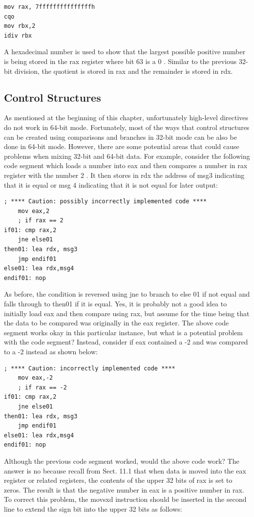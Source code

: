 \documentclass[10pt]{article}
\begin{document}
\begin{verbatim}
mov rax, 7fffffffffffffffh
cqo
mov rbx,2
idiv rbx
\end{verbatim}

A hexadecimal number is used to show that the largest possible positive number is being stored in the rax register where bit 63 is a 0 . Similar to the previous 32-bit division, the quotient is stored in rax and the remainder is stored in rdx.

\subsection*{Control Structures}
As mentioned at the beginning of this chapter, unfortunately high-level directives do not work in 64-bit mode. Fortunately, most of the ways that control structures can be created using comparisons and branches in 32-bit mode can be also be done in 64-bit mode. However, there are some potential areas that could cause problems when mixing 32-bit and 64-bit data. For example, consider the following code segment which loads a number into eax and then compares a number in rax register with the number 2 . It then stores in rdx the address of msg3 indicating that it is equal or msg 4 indicating that it is not equal for later output:

\begin{verbatim}
; **** Caution: possibly incorrectly implemented code ****
    mov eax,2
    ; if rax == 2
if01: cmp rax,2
    jne else01
then01: lea rdx, msg3
    jmp endif01
else01: lea rdx,msg4
endif01: nop
\end{verbatim}

As before, the condition is reversed using jne to branch to else 01 if not equal and falls through to then01 if it is equal. Yes, it is probably not a good idea to initially load eax and then compare using rax, but assume for the time being that the data to be compared was originally in the eax register. The above code segment works okay in this particular instance, but what is a potential problem with the code segment? Instead, consider if eax contained a -2 and was compared to a -2 instead as shown below:

\begin{verbatim}
; **** Caution: incorrectly implemented code ****
    mov eax,-2
    ; if rax == -2
if01: cmp rax,2
    jne else01
then01: lea rdx, msg3
    jmp endif01
else01: lea rdx,msg4
endif01: nop
\end{verbatim}

Although the previous code segment worked, would the above code work? The answer is no because recall from Sect. 11.1 that when data is moved into the eax register or related registers, the contents of the upper 32 bits of rax is set to zeros. The result is that the negative number in eax is a positive number in rax. To correct this problem, the movsxd instruction should be inserted in the second line to extend the sign bit into the upper 32 bits as follows:
\end{document}
